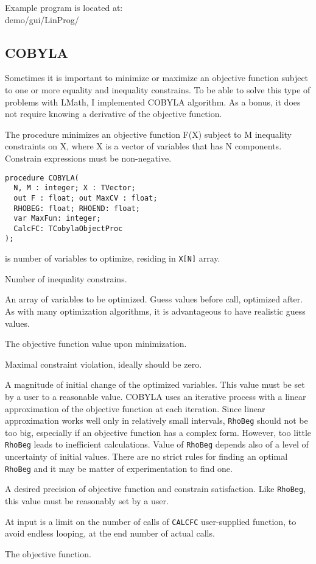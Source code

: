 \documentclass[12pt,a4paper,oneside]{article}
\newcommand{\code}[1]{\texttt{#1}}
\begin{document}
Example program is located at:\\
demo/gui/LinProg/
\subsection{COBYLA}\label{sec:cobyla}
Sometimes it is important to minimize or maximize an objective function subject to one or more equality and inequality constrains. To be able to solve this type of problems with LMath, I implemented COBYLA algorithm. As a bonus, it does not require knowing a derivative of the objective function.

The procedure minimizes an objective function F(X) subject to M inequality constraints on X, where X is a vector of variables that has N components. Constrain expressions must be non-negative. 
\begin{verbatim}
procedure COBYLA(
  N, M : integer; X : TVector;  
  out F : float; out MaxCV : float;  
  RHOBEG: float; RHOEND: float; 
  var MaxFun: integer;
  CalcFC: TCobylaObjectProc
);
\end{verbatim}
\begin{description}[noitemsep]
	\item[N] is number of variables to optimize, residing in \code{X[N]} array.
	\item[M] Number of inequality constrains.
	\item[X] An array of variables to be optimized. Guess values before call, optimized after. As with many optimization algorithms, it is advantageous to have realistic guess values.
	\item[F] The objective function value upon minimization.
	\item[MaxCV] Maximal constraint violation, ideally should be zero.
	\item[RhoBeg]\label{cobyla:rhobeg} A magnitude of initial change of the optimized variables. This value must be set by a user to a reasonable value. COBYLA uses an iterative process with a linear approximation of the objective function at each iteration. Since linear approximation works well only in relatively small intervals, \code{RhoBeg} should not be too big, especially if an objective function has a complex form. However, too little \code{RhoBeg} leads to inefficient calculations. Value of \code{RhoBeg} depends also of a level of uncertainty of initial values. There are no strict rules for finding an optimal \code{RhoBeg} and it may be matter of experimentation to find one.
	\item[RhoEnd] A desired precision of objective function and constrain satisfaction. Like \code{RhoBeg}, this value must be reasonably set by a user.
	\item[MaxFun] At input is a limit on the number of calls of \code{CALCFC} user-supplied function, to avoid endless looping, at the end number of actual calls. 
	\item[CalcFC] The objective function.
\end{description}
\end{document}
